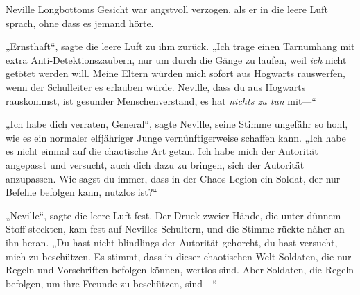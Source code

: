 Neville Longbottoms Gesicht war angstvoll verzogen, als er in die leere Luft sprach, ohne dass es jemand hörte.

„Ernsthaft“, sagte die leere Luft zu ihm zurück. „Ich trage einen Tarnumhang mit extra Anti-Detektionszaubern, nur um durch die Gänge zu laufen, weil \emph{ich} nicht getötet werden will. Meine Eltern würden mich sofort aus Hogwarts rauswerfen, wenn der Schulleiter es erlauben würde. Neville, dass du aus Hogwarts rauskommst, ist gesunder Menschenverstand, es hat \emph{nichts zu tun} mit—“

„Ich habe dich verraten, General“, sagte Neville, seine Stimme ungefähr so hohl, wie es ein normaler elfjähriger Junge vernünftigerweise schaffen kann. „Ich habe es nicht einmal auf die chaotische Art getan. Ich habe mich der Autorität angepasst und versucht, auch dich dazu zu bringen, sich der Autorität anzupassen. Wie sagst du immer, dass in der Chaos-Legion ein Soldat, der nur Befehle befolgen kann, nutzlos ist?“

„Neville“, sagte die leere Luft fest. Der Druck zweier Hände, die unter dünnem Stoff steckten, kam fest auf Nevilles Schultern, und die Stimme rückte näher an ihn heran. „Du hast nicht blindlings der Autorität gehorcht, du hast versucht, mich zu beschützen. Es stimmt, dass in dieser chaotischen Welt Soldaten, die nur Regeln und Vorschriften befolgen können, wertlos sind. Aber Soldaten, die Regeln befolgen, um ihre Freunde zu beschützen, sind—“

